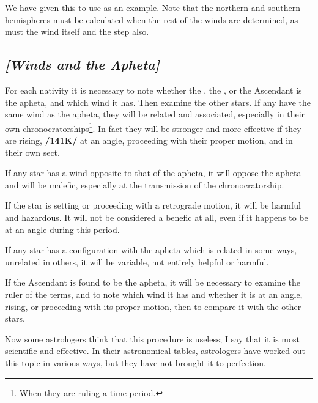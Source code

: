 We have given this to use as an example. Note that the northern and southern hemispheres must be calculated when the rest of the winds are determined, as must the wind itself and the step also.

\subsection{\textit{[Winds and the Apheta]}}
For each nativity it is necessary to note whether the \Sun, the \Moon, or the Ascendant is the apheta, and which wind it has. Then examine the other stars. If any have the same wind as the apheta, they will be related and associated, especially in their own chronocratorships\footnote{When they are ruling a time period.}. \mndl In fact they will be stronger and more effective if they are rising, \textbf{/141K/} at an angle, proceeding with their proper motion, and in their own sect.

If any star has a wind opposite to that of the apheta, it will oppose the apheta and will be malefic, especially at the transmission of the chronocratorship. 

If the star is setting or proceeding with a retrograde motion, it will be harmful and hazardous. It will not be considered a benefic at all, even if it happens to be at an angle during this period. 

If any star has a configuration with the apheta which is related in some ways, unrelated in others, it will be variable, not entirely helpful or harmful. 

If the Ascendant is found to be the apheta, it will be necessary to examine the ruler of the terms, and to note which wind it has and whether it is at an angle, rising, or proceeding with its proper motion, then to compare it with the other stars.

Now some astrologers think that this procedure is useless; I say that it is most scientific and effective. In their astronomical tables, astrologers have worked out this topic in various ways, but they have not brought it to perfection.

\newpage
